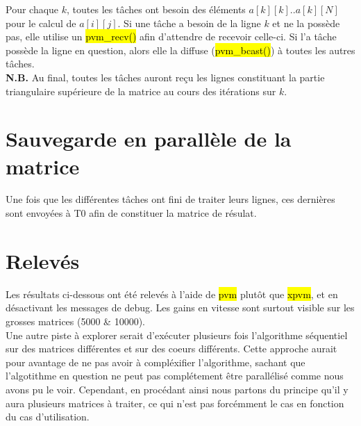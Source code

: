 \documentclass[a4paper,table]{article}
\begin{document}
Pour chaque $k$, toutes les tâches ont besoin des éléments $a[k][k]..a[k][N]$ pour
le calcul de $a[i][j]$. Si une tâche a besoin de la ligne $k$ et ne la possède pas,
elle utilise un \hl{pvm\_recv()} afin d'attendre de recevoir celle-ci. Si l'a tâche
possède la ligne en question, alors elle la diffuse (\hl{pvm\_bcast()}) à toutes
les autres tâches.\\

\textbf{N.B.} Au final, toutes les tâches auront reçu les lignes constituant la
partie triangulaire supérieure de la matrice au cours des itérations sur $k$.\\


\newpage

\section{Sauvegarde en parallèle de la matrice}

Une fois que les différentes tâches ont fini de traiter leurs lignes, ces
dernières sont envoyées à T0 afin de constituer la matrice de résulat.\\




\newpage

\section{Relevés}

Les résultats ci-dessous ont été relevés à l'aide de \hl{pvm} plutôt que
\hl{xpvm}, et en désactivant les messages de debug. Les gains en vitesse sont
surtout visible sur les grosses matrices (5000 \& 10000).\\

Une autre piste à explorer serait d'exécuter plusieurs fois l'algorithme
séquentiel sur des matrices différentes et sur des coeurs différents. Cette
approche aurait pour avantage de ne pas avoir à compléxifier l'algorithme,
sachant que l'algotithme en question ne peut pas complétement être parallélisé
comme nous avons pu le voir. Cependant, en procédant ainsi nous partons du
principe qu'il y aura plusieurs matrices à traiter, ce qui n'est pas forcémment
le cas en fonction du cas d'utilisation.\\
\end{document}
